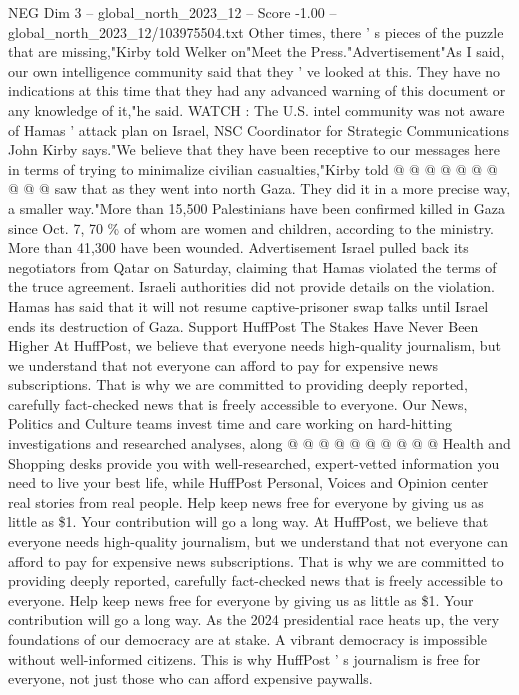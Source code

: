 \begin{textsample}{NEG Dim 3 – global\_north\_2023\_12 – Score -1.00 – global\_north\_2023\_12/103975504.txt}
Other times, there ' s pieces of the puzzle that are missing,"Kirby told Welker on"Meet the Press."Advertisement"As I said, our own intelligence community said that they ' ve looked at this.
They have no indications at this time that they had any advanced warning of this document or any knowledge of it,"he said.
WATCH : The U.S. intel community was not aware of Hamas ' attack plan on Israel, NSC Coordinator for Strategic Communications John Kirby says."We believe that they have been receptive to our messages here in terms of trying to minimalize civilian casualties,"Kirby told @ @ @ @ @ @ @ @ @ @ saw that as they went into north Gaza.
They did it in a more precise way, a smaller way."More than 15,500 Palestinians have been confirmed killed in Gaza since Oct. 7, 70 \% of whom are women and children, according to the ministry.
More than 41,300 have been wounded.
Advertisement Israel pulled back its negotiators from Qatar on Saturday, claiming that Hamas violated the terms of the truce agreement.
Israeli authorities did not provide details on the violation.
Hamas has said that it will not resume captive-prisoner swap talks until Israel ends its destruction of Gaza.
Support HuffPost The Stakes Have Never Been Higher At HuffPost, we believe that everyone needs high-quality journalism, but we understand that not everyone can afford to pay for expensive news subscriptions.
That is why we are committed to providing deeply reported, carefully fact-checked news that is freely accessible to everyone.
Our News, Politics and Culture teams invest time and care working on hard-hitting investigations and researched analyses, along @ @ @ @ @ @ @ @ @ @ Health and Shopping desks provide you with well-researched, expert-vetted information you need to live your best life, while HuffPost Personal, Voices and Opinion center real stories from real people.
Help keep news free for everyone by giving us as little as \$1.
Your contribution will go a long way.
At HuffPost, we believe that everyone needs high-quality journalism, but we understand that not everyone can afford to pay for expensive news subscriptions.
That is why we are committed to providing deeply reported, carefully fact-checked news that is freely accessible to everyone.
Help keep news free for everyone by giving us as little as \$1.
Your contribution will go a long way.
As the 2024 presidential race heats up, the very foundations of our democracy are at stake.
A vibrant democracy is impossible without well-informed citizens.
This is why HuffPost ' s journalism is free for everyone, not just those who can afford expensive paywalls.

\end{textsample}
